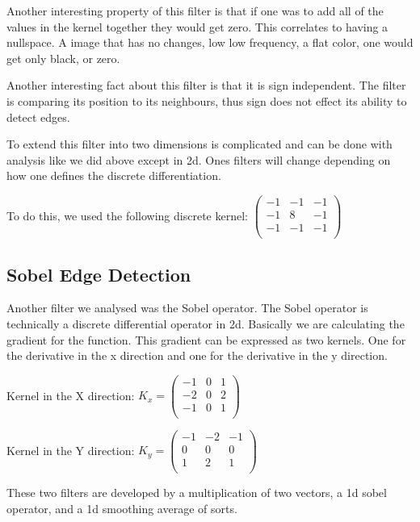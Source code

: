 \documentclass[11pt]{article}
\begin{document}
Another interesting property of this filter is that if one was to add all of the values in the kernel together they would get zero. This correlates to having a nullspace. A image that has no changes, low low frequency, a flat color, one would get only black, or zero.

Another interesting fact about this filter is that it is sign independent. The filter is comparing its position to its neighbours, thus sign does not effect its ability to detect edges.  
 
To extend this filter into two dimensions is complicated and can be done with analysis like we did above except in 2d. Ones filters will change depending on how one defines the discrete differentiation.

To do this, we used the following discrete kernel:
$\begin{pmatrix}
	-1 & -1 & -1\\
	-1 & 8 & -1\\
	-1 & -1 & -1\\
\end{pmatrix}$


\subsection{Sobel Edge Detection}
Another filter we analysed was the Sobel operator. The Sobel operator is technically a discrete differential operator in 2d. Basically we are calculating the gradient for the function. This gradient can be expressed as two kernels. One for the derivative in the x direction and one for the derivative in the y direction.

Kernel in the X direction:
$K_x = \begin{pmatrix}
	-1 & 0 & 1\\
	-2 & 0 & 2\\
	-1 & 0 & 1\\
\end{pmatrix}$

Kernel in the Y direction:
$K_y = \begin{pmatrix}
	-1 & -2 & -1\\
	0 & 0 & 0\\
	1 & 2 & 1\\
\end{pmatrix}$

These two filters are developed by a multiplication of two vectors, a 1d sobel operator, and a 1d smoothing average of sorts. 
\end{document}
